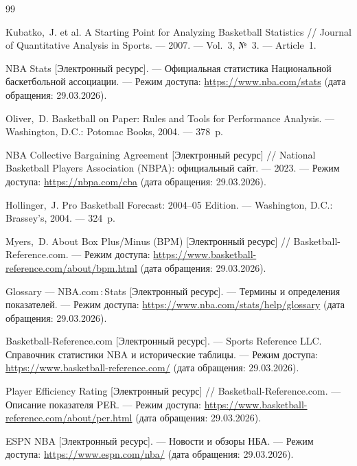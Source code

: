 \begingroup
\raggedright
\sloppy
\begin{thebibliography}{99}


	Kubatko,~J. et al. A Starting Point for Analyzing Basketball Statistics //
	Journal of Quantitative Analysis in Sports. --- 2007. --- Vol.~3, №~3. ---
	Article~1.

	NBA Stats [Электронный ресурс]. --- Официальная статистика Национальной
	баскетбольной ассоциации. --- Режим доступа: \url{https://www.nba.com/stats}
	(дата обращения: 29.03.2026).

	Oliver,~D. Basketball on Paper: Rules and Tools for Performance Analysis. ---
	Washington, D.C.: Potomac Books, 2004. --- 378~p.

	NBA Collective Bargaining Agreement [Электронный ресурс] //
	National Basketball Players Association (NBPA): официальный сайт. --- 2023. ---
	Режим доступа: \url{https://nbpa.com/cba}
	(дата обращения: 29.03.2026).

	Hollinger,~J. Pro Basketball Forecast: 2004--05 Edition. --- Washington,
	D.C.: Brassey's, 2004. --- 324~p.

	Myers,~D. About Box Plus/Minus (BPM) [Электронный ресурс] //
	Basketball-Reference.com. --- Режим доступа:
	\url{https://www.basketball-reference.com/about/bpm.html}
	(дата обращения: 29.03.2026).

	Glossary --- NBA.com\,:\,Stats [Электронный ресурс]. --- Термины и
	определения показателей. --- Режим доступа:
	\url{https://www.nba.com/stats/help/glossary}
	(дата обращения: 29.03.2026).

	Basketball-Reference.com [Электронный ресурс]. --- Sports Reference LLC.
	Справочник статистики NBA и исторические таблицы. --- Режим доступа:
	\url{https://www.basketball-reference.com/} (дата обращения: 29.03.2026).

	Player Efficiency Rating [Электронный ресурс] // Basketball-Reference.com. ---
	Описание показателя PER. --- Режим доступа:
	\url{https://www.basketball-reference.com/about/per.html}
	(дата обращения: 29.03.2026).

	ESPN NBA [Электронный ресурс]. --- Новости и обзоры НБА. --- Режим доступа:
	\url{https://www.espn.com/nba/} (дата обращения: 29.03.2026).


\end{thebibliography}
